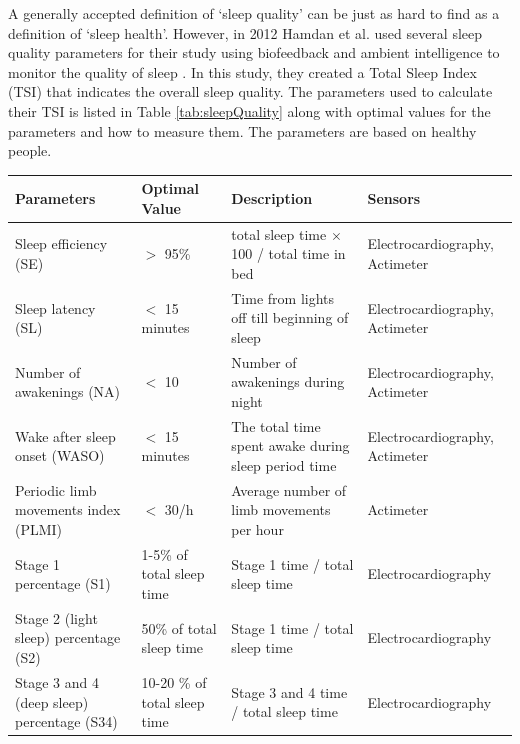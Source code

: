 \documentclass[12pt]{article} %
\begin{document}
A generally accepted definition of `sleep quality' can be just as hard to find as a definition of `sleep health'. However, in 2012 Hamdan et al. used several sleep quality parameters for their study using biofeedback and ambient intelligence to monitor the quality of sleep \cite{Hamdan2012ABS}. In this study, they created a Total Sleep Index (TSI) that indicates the overall sleep quality. The parameters used to calculate their TSI is listed in Table \ref{tab:sleepQuality} along with optimal values for the parameters and how to measure them. The parameters are based on healthy people. 

\begin{table}[H]
\center
\begin{footnotesize}
	\begin{tabular}{|p{4cm} |p{2.6cm} |p{4cm} |p{3.3cm} |}
	\hline
	\textbf{Parameters} & \textbf{Optimal Value} & \textbf{Description} & \textbf{Sensors} \\
	\hline
	Sleep efficiency (SE) & $>$ 95\% & total sleep time $\times$ 100 / total time in bed & Electrocardiography, \newline Actimeter\\
	\hline
	Sleep latency (SL) & $<$ 15 minutes & Time from lights off till beginning of sleep & Electrocardiography, \newline Actimeter\\
	\hline 
	Number of awakenings (NA) & $<$ 10 & Number of awakenings during night & Electrocardiography, \newline Actimeter\\
	\hline
	Wake after sleep onset (WASO) & $<$ 15 minutes & The total time spent awake during sleep period time & Electrocardiography, \newline Actimeter\\
	\hline
	Periodic limb movements index (PLMI) & $<$ 30/h & Average number of limb movements per hour & Actimeter\\
	\hline
	Stage 1 percentage (S1) & 1-5\% of total sleep time & Stage 1 time / total sleep time & Electrocardiography\\
	\hline
	Stage 2 (light sleep) percentage (S2) & 50\% of total sleep time & Stage 1 time / total sleep time & Electrocardiography\\
	\hline
	Stage 3 and 4 (deep sleep) percentage (S34) & 10-20 \% of total sleep time & Stage 3 and 4 time / total sleep time & Electrocardiography\\

\end{tabular}
\end{footnotesize}
\end{table}
\end{document}
